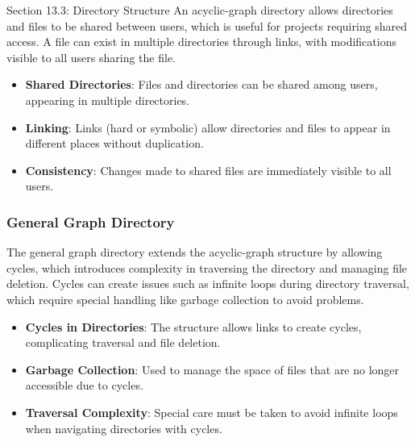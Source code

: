 \begin{notes}{Section 13.3: Directory Structure}
    An acyclic-graph directory allows directories and files to be shared between users, which is useful for projects requiring shared access. A file can exist in multiple directories through links, 
    with modifications visible to all users sharing the file.
    
    \begin{highlight}
    
        \begin{itemize}
            \item \textbf{Shared Directories}: Files and directories can be shared among users, appearing in multiple directories.
            \item \textbf{Linking}: Links (hard or symbolic) allow directories and files to appear in different places without duplication.
            \item \textbf{Consistency}: Changes made to shared files are immediately visible to all users.
        \end{itemize}
    
    \end{highlight}
    
    \subsubsection*{General Graph Directory}
    
    The general graph directory extends the acyclic-graph structure by allowing cycles, which introduces complexity in traversing the directory and managing file deletion. Cycles can create issues such 
    as infinite loops during directory traversal, which require special handling like garbage collection to avoid problems.
    
    \begin{highlight}
    
        \begin{itemize}
            \item \textbf{Cycles in Directories}: The structure allows links to create cycles, complicating traversal and file deletion.
            \item \textbf{Garbage Collection}: Used to manage the space of files that are no longer accessible due to cycles.
            \item \textbf{Traversal Complexity}: Special care must be taken to avoid infinite loops when navigating directories with cycles.
        \end{itemize}
    

\end{highlight}
\end{notes}
